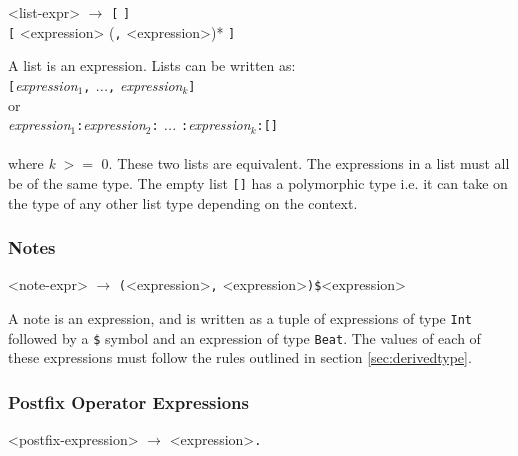 \begin{grammar}
<list-expr> $\rightarrow$ \texttt{[} \texttt{]} \\
													\texttt{[} <expression> (\texttt{,} <expression>)* \texttt{]}
\end{grammar}
A list is an expression. Lists can be written as: \\

\texttt{[}\emph{expression$_{1}$}\texttt{,} \emph{...}\texttt{,} \emph{expression$_{k}$}\texttt{]} \\

	or \\

  \emph{expression$_{1}$}\texttt{:}\emph{expression$_{2}$}\texttt{:} \emph{...} \texttt{:}\emph{expression$_{k}$}\texttt{:[]} \\ \\
where \textit{k} $>=$ 0. These two lists are equivalent.
The expressions in a list must all be of the same type. The empty list \texttt{[]} has a polymorphic type i.e. it can take on the
type of any other list type depending on the context.


\subsubsection{Notes}

\begin{grammar}
<note-expr> $\rightarrow$ \texttt{(}<expression>\texttt{,} <expression>\texttt{)\$}<expression>
\end{grammar}

A note is an expression, and is written as a tuple of expressions of type \texttt{Int} followed
by a \texttt{\$} symbol and an expression of type \texttt{Beat}. The values of each of these
expressions must follow the rules outlined in section \ref{sec:derivedtype}.

\subsubsection{Postfix Operator Expressions}
\label{sec:postfixop}

\begin{grammar}
<postfix-expression> $\rightarrow$ <expression>\texttt{.}
\end{grammar}

